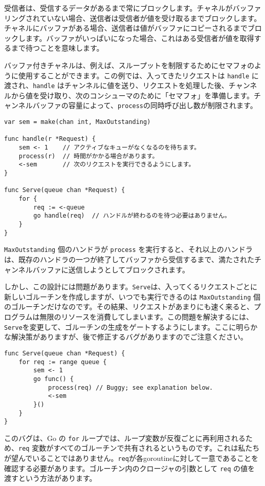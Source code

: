 \documentclass{jsarticle}
\begin{document}
受信者は、受信するデータがあるまで常にブロックします。チャネルがバッファリングされていない場合、送信者は受信者が値を受け取るまでブロックします。チャネルにバッファがある場合、送信者は値がバッファにコピーされるまでブロックします。バッファがいっぱいになった場合、これはある受信者が値を取得するまで待つことを意味します。

バッファ付きチャネルは、例えば、スループットを制限するためにセマフォのように使用することができます。この例では、入ってきたリクエストは
\texttt{handle} に渡され、\texttt{handle}
はチャンネルに値を送り、リクエストを処理した後、チャンネルから値を受け取り、次のコンシューマのために「セマフォ」を準備します。チャンネルバッファの容量によって、\texttt{process}の同時呼び出し数が制限されます。

\begin{lstlisting}[numbers=none]
var sem = make(chan int, MaxOutstanding)

func handle(r *Request) {
    sem <- 1    // アクティブなキューがなくなるのを待ちます。
    process(r)  // 時間がかかる場合があります。
    <-sem       // 次のリクエストを実行できるようにします。
}

func Serve(queue chan *Request) {
    for {
        req := <-queue
        go handle(req)  // ハンドルが終わるのを待つ必要はありません。
    }
}
\end{lstlisting}

\texttt{MaxOutstanding} 個のハンドラが \texttt{process}
を実行すると、それ以上のハンドラは、既存のハンドラの一つが終了してバッファから受信するまで、満たされたチャンネルバッファに送信しようとしてブロックされます。

しかし、この設計には問題があります。\texttt{Serve}は、入ってくるリクエストごとに新しいゴルーチンを作成しますが、いつでも実行できるのは
\texttt{MaxOutstanding}
個のゴルーチンだけなのです。その結果、リクエストがあまりにも速く来ると、プログラムは無限のリソースを消費してしまいます。この問題を解決するには、\texttt{Serve}を変更して、ゴルーチンの生成をゲートするようにします。ここに明らかな解決策がありますが、後で修正するバグがありますのでご注意ください。

\begin{lstlisting}[numbers=none]
func Serve(queue chan *Request) {
    for req := range queue {
        sem <- 1
        go func() {
            process(req) // Buggy; see explanation below.
            <-sem
        }()
    }
}
\end{lstlisting}

このバグは、Go の \texttt{for}
ループでは、ループ変数が反復ごとに再利用されるため、\texttt{req}
変数がすべてのゴルーチンで共有されるというものです。これは私たちが望んでいることではありません。\texttt{req}が各goroutineに対して一意であることを確認する必要があります。ゴルーチン内のクロージャの引数として
\texttt{req} の値を渡すという方法があります。
\end{document}
